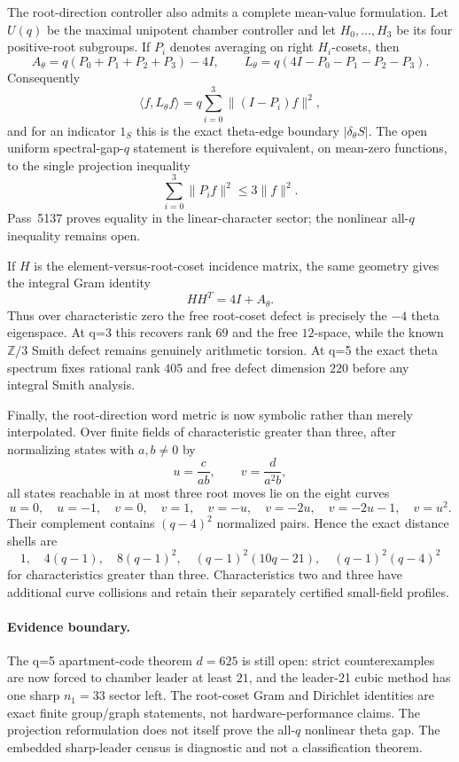The root-direction controller also admits a complete mean-value formulation.  Let $U(q)$ be the maximal unipotent chamber controller and let $H_0,\dots,H_3$ be its four positive-root subgroups.  If $P_i$ denotes averaging on right $H_i$-cosets, then
\[
 \boxed{A_\theta=q(P_0+P_1+P_2+P_3)-4I},
 \qquad
 \boxed{L_\theta=q(4I-P_0-P_1-P_2-P_3)}.
\]
Consequently
\[
 \langle f,L_\theta f\rangle
 =q\sum_{i=0}^{3}\|(I-P_i)f\|^2,
\]
and for an indicator $1_S$ this is the exact theta-edge boundary $|\delta_\theta S|$.  The open uniform spectral-gap-$q$ statement is therefore equivalent, on mean-zero functions, to the single projection inequality
\[
 \sum_{i=0}^{3}\|P_i f\|^2\le3\|f\|^2.
\]
Pass~5137 proves equality in the linear-character sector; the nonlinear all-$q$ inequality remains open.

If $H$ is the element-versus-root-coset incidence matrix, the same geometry gives the integral Gram identity
\[
 \boxed{HH^T=4I+A_\theta}.
\]
Thus over characteristic zero the free root-coset defect is precisely the $-4$ theta eigenspace.  At q=3 this recovers rank $69$ and the free $12$-space, while the known $\mathbb Z/3$ Smith defect remains genuinely arithmetic torsion.  At q=5 the exact theta spectrum fixes rational rank $405$ and free defect dimension $220$ before any integral Smith analysis.

Finally, the root-direction word metric is now symbolic rather than merely interpolated.  Over finite fields of characteristic greater than three, after normalizing states with $a,b\ne0$ by
\[
 u=\frac{c}{ab},\qquad v=\frac{d}{a^2b},
\]
all states reachable in at most three root moves lie on the eight curves
\[
 u=0,\quad u=-1,\quad v=0,\quad v=1,\quad v=-u,\quad
 v=-2u,\quad v=-2u-1,\quad v=u^2.
\]
Their complement contains $(q-4)^2$ normalized pairs.  Hence the exact distance shells are
\[
 \boxed{1,\quad4(q-1),\quad8(q-1)^2,\quad
 (q-1)^2(10q-21),\quad(q-1)^2(q-4)^2}
\]
for characteristics greater than three.  Characteristics two and three have additional curve collisions and retain their separately certified small-field profiles.

\paragraph{Evidence boundary.}
The q=5 apartment-code theorem $d=625$ is still open: strict counterexamples are now forced to chamber leader at least $21$, and the leader-21 cubic method has one sharp $n_1=33$ sector left.  The root-coset Gram and Dirichlet identities are exact finite group/graph statements, not hardware-performance claims.  The projection reformulation does not itself prove the all-$q$ nonlinear theta gap.  The embedded sharp-leader census is diagnostic and not a classification theorem.
\fi

